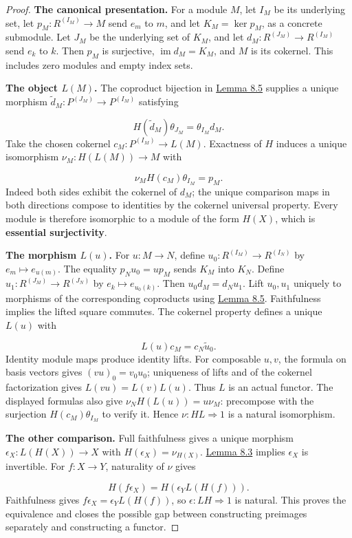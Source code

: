 \documentclass[11pt,a4paper]{article}
\theoremstyle{plain}
\theoremstyle{definition}
\begin{document}
\begin{proof}

\textbf{The canonical presentation.} For a module \(M\), let \(I_M\) be its underlying set, let \(p_M:R^{(I_M)}\to M\) send \(e_m\) to \(m\), and let \(K_M=\ker p_M\), as a concrete submodule. Let \(J_M\) be the underlying set of \(K_M\), and let \(d_M:R^{(J_M)}\to R^{(I_M)}\) send \(e_k\) to \(k\). Then \(p_M\) is surjective, \(\operatorname{im}d_M=K_M\), and \(M\) is its cokernel. This includes zero modules and empty index sets.

 
\textbf{The object \(L(M)\).} The coproduct bijection in \hyperref[env-8-5]{Lemma 8.5} supplies a unique morphism \(\widetilde d_M:P^{(J_M)}\to P^{(I_M)}\) satisfying

 \[H(\widetilde d_M)\theta_{J_M}=\theta_{I_M}d_M.\] 
Take the chosen cokernel \(c_M:P^{(I_M)}\to L(M)\). Exactness of \(H\) induces a unique isomorphism \(\nu_M:H(L(M))\to M\) with

 \[\nu_M H(c_M)\theta_{I_M}=p_M.\] 
Indeed both sides exhibit the cokernel of \(d_M\); the unique comparison maps in both directions compose to identities by the cokernel universal property. Every module is therefore isomorphic to a module of the form \(H(X)\), which is \textbf{essential surjectivity}.

 
\textbf{The morphism \(L(u)\).} For \(u:M\to N\), define \(u_0:R^{(I_M)}\to R^{(I_N)}\) by \(e_m\mapsto e_{u(m)}\). The equality \(p_Nu_0=up_M\) sends \(K_M\) into \(K_N\). Define \(u_1:R^{(J_M)}\to R^{(J_N)}\) by \(e_k\mapsto e_{u_0(k)}\). Then \(u_0d_M=d_Nu_1\). Lift \(u_0,u_1\) uniquely to morphisms of the corresponding coproducts using \hyperref[env-8-5]{Lemma 8.5}. Faithfulness implies the lifted square commutes. The cokernel property defines a unique \(L(u)\) with

 \[L(u)c_M=c_N\widetilde u_0.\] 
Identity module maps produce identity lifts. For composable \(u,v\), the formula on basis vectors gives \((vu)_0=v_0u_0\); uniqueness of lifts and of the cokernel factorization gives \(L(vu)=L(v)L(u)\). Thus \(L\) is an actual functor. The displayed formulas also give \(\nu_NH(L(u))=u\nu_M\): precompose with the surjection \(H(c_M)\theta_{I_M}\) to verify it. Hence \(\nu:HL\Rightarrow1\) is a natural isomorphism.

 
\textbf{The other comparison.} Full faithfulness gives a unique morphism \(\epsilon_X:L(H(X))\to X\) with \(H(\epsilon_X)=\nu_{H(X)}\). \hyperref[env-8-3]{Lemma 8.3} implies \(\epsilon_X\) is invertible. For \(f:X\to Y\), naturality of \(\nu\) gives

 \[H(f\epsilon_X)=H(\epsilon_YL(H(f))).\] 
Faithfulness gives \(f\epsilon_X=\epsilon_YL(H(f))\), so \(\epsilon:LH\Rightarrow1\) is natural. This proves the equivalence and closes the possible gap between constructing preimages separately and constructing a functor.


\end{proof}
 
\end{document}
